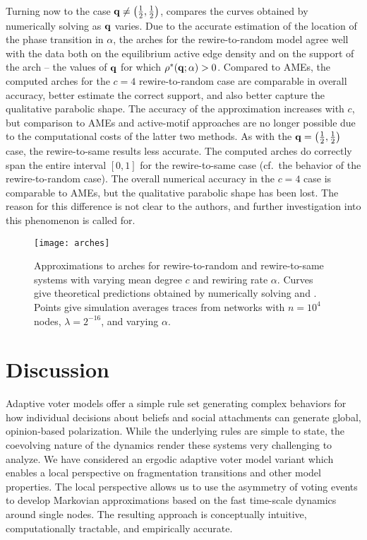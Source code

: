 \documentclass[review, onefignum, onetabnum]{siamart171218}
\begin{document}
		Turning now to the case $\mathbf{q} \neq \left(\frac{1}{2}, \frac{1}{2}\right)$,  compares the curves obtained by numerically solving  as $\mathbf{q}$ varies. 
		Due to the accurate estimation of the location of the phase transition in $\alpha$, the arches for the rewire-to-random model agree well with the data both on the equilibrium active edge density and on the support of the arch -- the values of $\mathbf{q}$ for which $\rho^*(\mathbf{q};\alpha) > 0$. 
		Compared to AMEs, the computed arches for the $c = 4$ rewire-to-random case are comparable in overall accuracy, better estimate the correct support, and also better capture the qualitative parabolic shape.  
		The accuracy of the approximation increases with $c$, but comparison to AMEs and active-motif approaches are no longer possible due to the computational costs of the latter two methods. 
		As with the $\mathbf{q} = \left(\frac{1}{2}, \frac{1}{2}\right)$ case, the rewire-to-same results less accurate. 
		The computed arches do correctly span the entire interval $[0,1]$ for the rewire-to-same case (cf.\ the behavior of the rewire-to-random case). 
		The overall numerical accuracy in the $c = 4$ case is comparable to AMEs, but the qualitative parabolic shape has been lost. 
		The reason for this difference is not clear to the authors, and further investigation into this phenomenon is called for. 

		\begin{figure}
			\centering
				\texttt{[image: arches]}
			\caption{Approximations to arches for rewire-to-random and rewire-to-same systems with varying mean degree $c$ and rewiring rate $\alpha$. 
			Curves give theoretical predictions obtained by numerically solving  and . 
			Points give simulation averages traces from networks with $n = 10^4$ nodes,  $\lambda = 2^{-16}$, and varying $\alpha$.}
			\label{fig:arches}
		\end{figure}

\section{Discussion} \label{sec:discussion}

	Adaptive voter models offer a simple rule set generating complex behaviors for how individual decisions about beliefs and social attachments can generate global, opinion-based polarization. 
	While the underlying rules are simple to state, the coevolving nature of the dynamics render these systems very challenging to analyze. 
	We have considered an ergodic adaptive voter model variant which enables a local perspective on fragmentation transitions and other model properties. 
	The local perspective allows us to use the asymmetry of voting events to develop Markovian approximations based on the fast time-scale dynamics around single nodes. 
	The resulting approach is conceptually intuitive, computationally tractable, and empirically accurate. 
	
\end{document}
